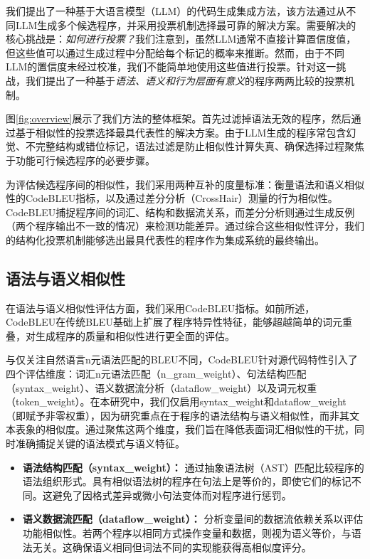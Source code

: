 \documentclass{article}
\begin{document}
\begin{CJK*}{UTF8}{gbsn}
我们提出了一种基于大语言模型（LLM）的代码生成集成方法，该方法通过从不同LLM生成多个候选程序，并采用投票机制选择最可靠的解决方案。需要解决的核心挑战是：{\em 如何进行投票？}我们注意到，虽然LLM通常不直接计算置信度值，但这些值可以通过生成过程中分配给每个标记的概率来推断。然而，由于不同LLM的置信度未经过校准，我们不能简单地使用这些值进行投票。针对这一挑战，我们提出了一种基于{\em 语法、语义和行为层面有意义}的程序两两比较的投票机制。

图\ref{fig:overview}展示了我们方法的整体框架。首先过滤掉语法无效的程序，然后通过基于相似性的投票选择最具代表性的解决方案。由于LLM生成的程序常包含幻觉、不完整结构或错位标记，语法过滤是防止相似性计算失真、确保选择过程聚焦于功能可行候选程序的必要步骤。

为评估候选程序间的相似性，我们采用两种互补的度量标准：衡量语法和语义相似性的CodeBLEU指标，以及通过差分分析（CrossHair）测量的行为相似性。CodeBLEU捕捉程序间的词汇、结构和数据流关系，而差分分析则通过生成反例（两个程序输出不一致的情况）来检测功能差异。通过综合这些相似性评分，我们的结构化投票机制能够选出最具代表性的程序作为集成系统的最终输出。
\subsection{语法与语义相似性}
在语法与语义相似性评估方面，我们采用CodeBLEU指标。如前所述，CodeBLEU在传统BLEU基础上扩展了程序特异性特征，能够超越简单的词元重叠，对生成程序的质量和相似性进行更全面的评估。

与仅关注自然语言n元语法匹配的BLEU不同，CodeBLEU针对源代码特性引入了四个评估维度：词汇n元语法匹配（n\_gram\_weight）、句法结构匹配（syntax\_weight）、语义数据流分析（dataflow\_weight）以及词元权重（token\_weight）。在本研究中，我们仅启用syntax\_weight和dataflow\_weight（即赋予非零权重），因为研究重点在于程序的语法结构与语义相似性，而非其文本表象的相似度。通过聚焦这两个维度，我们旨在降低表面词汇相似性的干扰，同时准确捕捉关键的语法模式与语义特征。

\begin{itemize}
    \item \textbf{语法结构匹配（syntax\_weight）：}
通过抽象语法树（AST）匹配比较程序的语法组织形式。具有相似语法树的程序在句法上是等价的，即使它们的标记不同。这避免了因格式差异或微小句法变体而对程序进行惩罚。
    \item \textbf{语义数据流匹配（dataflow\_weight）：}
分析变量间的数据流依赖关系以评估功能相似性。若两个程序以相同方式操作变量和数据，则视为语义等价，与语法无关。这确保语义相同但词法不同的实现能获得高相似度评分。
\end{itemize}


\end{CJK*}
\end{document}
